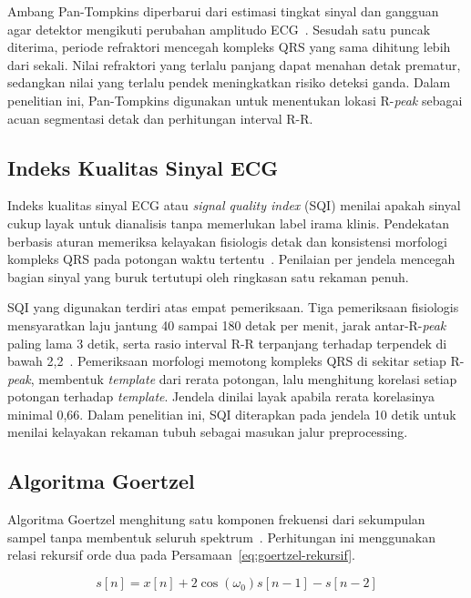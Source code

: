 Ambang Pan-Tompkins diperbarui dari estimasi tingkat sinyal dan gangguan agar detektor mengikuti perubahan amplitudo ECG~\cite{pan_tompkins_1985, li_2020}. Sesudah satu puncak diterima, periode refraktori mencegah kompleks QRS yang sama dihitung lebih dari sekali. Nilai refraktori yang terlalu panjang dapat menahan detak prematur, sedangkan nilai yang terlalu pendek meningkatkan risiko deteksi ganda. Dalam penelitian ini, Pan-Tompkins digunakan untuk menentukan lokasi R-\textit{peak} sebagai acuan segmentasi detak dan perhitungan interval R-R.

\subsection{Indeks Kualitas Sinyal ECG}

Indeks kualitas sinyal ECG atau \textit{signal quality index} (SQI) menilai apakah sinyal cukup layak untuk dianalisis tanpa memerlukan label irama klinis. Pendekatan berbasis aturan memeriksa kelayakan fisiologis detak dan konsistensi morfologi kompleks QRS pada potongan waktu tertentu~\cite{syversen_2024}. Penilaian per jendela mencegah bagian sinyal yang buruk tertutupi oleh ringkasan satu rekaman penuh.

SQI yang digunakan terdiri atas empat pemeriksaan. Tiga pemeriksaan fisiologis mensyaratkan laju jantung 40 sampai 180 detak per menit, jarak antar-R-\textit{peak} paling lama 3 detik, serta rasio interval R-R terpanjang terhadap terpendek di bawah 2,2~\cite{syversen_2024}. Pemeriksaan morfologi memotong kompleks QRS di sekitar setiap R-\textit{peak}, membentuk \textit{template} dari rerata potongan, lalu menghitung korelasi setiap potongan terhadap \textit{template}. Jendela dinilai layak apabila rerata korelasinya minimal 0,66. Dalam penelitian ini, SQI diterapkan pada jendela 10 detik untuk menilai kelayakan rekaman tubuh sebagai masukan jalur preprocessing.

\subsection{Algoritma Goertzel}

Algoritma Goertzel menghitung satu komponen frekuensi dari sekumpulan sampel tanpa membentuk seluruh spektrum~\cite{goertzel_1958}. Perhitungan ini menggunakan relasi rekursif orde dua pada Persamaan~\ref{eq:goertzel-rekursif}.

\begin{equation}
\label{eq:goertzel-rekursif}
s[n] = x[n] + 2\cos(\omega_0)s[n-1] - s[n-2]
\end{equation}

